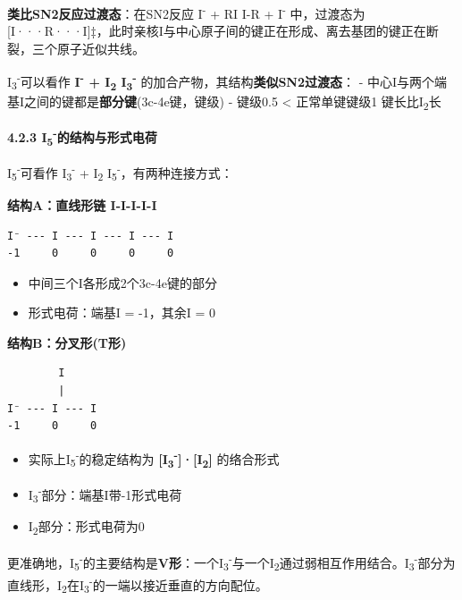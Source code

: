 \textbf{类比SN2反应过渡态}：在SN2反应 I\textsuperscript{-} + RI \箭 I-R + I\textsuperscript{-} 中，过渡态为 {[}I···R···I{]}‡，此时亲核I与中心原子间的键正在形成、离去基团的键正在断裂，三个原子近似共线。

I\textsubscript{3}\textsuperscript{-}可以看作 \textbf{I\textsuperscript{-} + I\textsubscript{2} \箭 I\textsubscript{3}\textsuperscript{-}} 的加合产物，其结构\textbf{类似SN2过渡态}：
- 中心I与两个端基I之间的键都是\textbf{部分键}(3c-4e键，键级)
- 键级0.5 \textless{} 正常单键键级1 \箭 键长比I\textsubscript{2}长

\textbf{4.2.3 I\textsubscript{5}\textsuperscript{-}的结构与形式电荷}

I\textsubscript{5}\textsuperscript{-}可看作 I\textsubscript{3}\textsuperscript{-} + I\textsubscript{2} \箭 I\textsubscript{5}\textsuperscript{-}，有两种连接方式：

\textbf{结构A：直线形链 I-I-I-I-I}

\begin{verbatim}
I⁻ --- I --- I --- I --- I
-1     0     0     0     0
\end{verbatim}

\begin{itemize}
\tightlist
\item
  中间三个I各形成2个3c-4e键的部分
\item
  形式电荷：端基I = -1，其余I = 0
\end{itemize}

\textbf{结构B：分叉形(T形)}

\begin{verbatim}
        I
        |
I⁻ --- I --- I
-1     0     0
\end{verbatim}

\begin{itemize}
\tightlist
\item
  实际上I\textsubscript{5}\textsuperscript{-}的稳定结构为 \textbf{{[}I\textsubscript{3}\textsuperscript{-}{]}·{[}I\textsubscript{2}{]}} 的络合形式
\item
  I\textsubscript{3}\textsuperscript{-}部分：端基I带-1形式电荷
\item
  I\textsubscript{2}部分：形式电荷为0
\end{itemize}

更准确地，I\textsubscript{5}\textsuperscript{-}的主要结构是\textbf{V形}：一个I\textsubscript{3}\textsuperscript{-}与一个I\textsubscript{2}通过弱相互作用结合。I\textsubscript{3}\textsuperscript{-}部分为直线形，I\textsubscript{2}在I\textsubscript{3}\textsuperscript{-}的一端以接近垂直的方向配位。

